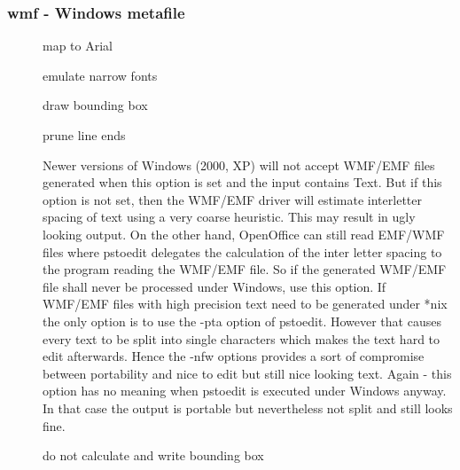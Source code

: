 \documentclass[english,a4paper]{article}
\begin{document}
\subsubsection{wmf - Windows metafile}
\begin{description}
\item[] 
map to Arial


\item[] 
emulate narrow fonts


\item[] 
draw bounding box


\item[] 
prune line ends


\item[] 
Newer versions of Windows (2000, XP) will not accept WMF/EMF files generated when this option is set and the input contains Text. But if this option is not set, then the WMF/EMF driver will estimate interletter spacing of text using a very coarse heuristic. This may result in ugly looking output. On the other hand, OpenOffice can still read EMF/WMF files where pstoedit delegates the calculation of the inter letter spacing to the program reading the WMF/EMF file. So if the generated WMF/EMF file shall never be processed under Windows, use this option. If WMF/EMF files with high precision text need to be generated under *nix the only option is to use the -pta option of pstoedit. However that causes every text to be split into single characters which makes the text hard to edit afterwards. Hence the -nfw options provides a sort of compromise between portability and nice to edit but still nice looking text. Again - this option has no meaning when pstoedit is executed under Windows anyway. In that case the output is portable but nevertheless not split and still looks fine.


\item[] 
do not calculate and write bounding box


\end{description}
\end{document}
